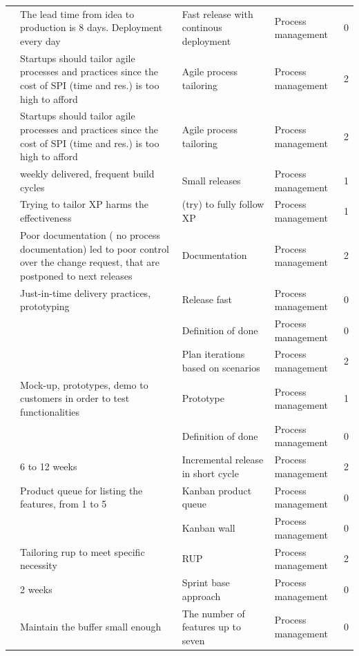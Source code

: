 \documentclass[final,5p,times,twocolumn]{elsarticle}
\begin{document}
\begin{center}
\begin{longtable}{|p{0.4in}|p{3in}|p{1.3in}|p{1in}|p{0.3in}|}
\cite{Taipale2010} & The lead time from idea to production is 8 days. Deployment every day & Fast release with continous deployment & Process management & 0 \\
\cite{Coleman2008} & Startups should tailor agile processes and practices since the cost of SPI (time and res.) is too high to afford & Agile process tailoring & Process management & 2 \\
\cite{Coleman2008a} & Startups should tailor agile processes and practices since the cost of SPI (time and res.) is too high to afford & Agile process tailoring & Process management & 2 \\
\cite{Tingling2007} & weekly delivered,  frequent build cycles & Small releases & Process management & 1 \\
\cite{Deias} & Trying to tailor XP harms the effectiveness & (try) to fully follow XP & Process management & 1 \\
\cite{Kajko-Mattsson2008} & Poor documentation ( no process documentation)  led to poor control over the change request, that are postponed to next releases & Documentation & Process management & 2 \\
\cite{Deakins2005} & Just-in-time delivery practices, prototyping & Release fast & Process management & 0 \\
\cite{Kuvinka2011} &       & Definition of done & Process management & 0 \\
\cite{Zettel2001} &       & Plan iterations based on scenarios & Process management & 2 \\
\cite{Camel1994a} & Mock-up, prototypes, demo to customers in order to test functionalities & Prototype & Process management & 1 \\
\cite{Taipale2010} &       & Definition of done & Process management & 0 \\
\cite{Ambler2002} & 6 to 12 weeks & Incremental release in short cycle & Process management & 2 \\
\cite{Taipale2010} & Product queue for listing the features, from 1 to 5 & Kanban product queue & Process management & 0 \\
\cite{Kuvinka2011} &       & Kanban wall & Process management & 0 \\
\cite{Ambler2002} & Tailoring rup to meet specific necessity & RUP   & Process management & 2 \\
\cite{Kuvinka2011} & 2 weeks & Sprint base approach & Process management & 0 \\
\cite{Taipale2010} & Maintain the buffer small enough & The number of features up to seven & Process management & 0 \\

\end{longtable}
\end{center}
\end{document}

